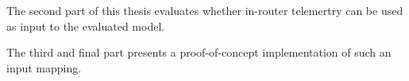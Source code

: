 The second part of this thesis evaluates whether in-router telemertry can be
used as input to the evaluated model.

The third and final part presents a proof-of-concept implementation of such an
input mapping.















